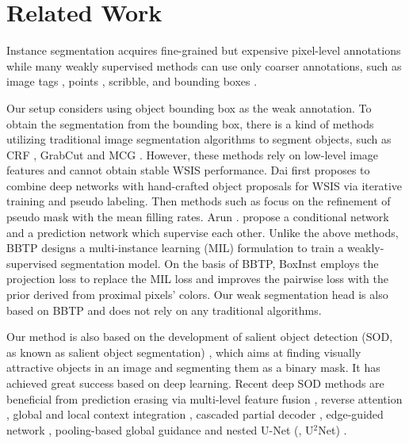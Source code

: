 \documentclass[final]{cvpr}
\begin{document}
\vspace{-3mm}
\section{Related Work}
\vspace{-1mm}

Instance segmentation acquires fine-grained but expensive pixel-level annotations while many weakly supervised methods can use only coarser annotations, such as image tags \cite{ahn2019weakly,cholakkal2019object,ge2019label,laradji2019masks,zhou2018weakly,zhu2019learning}, points \cite{laradji2019instance}, scribble\cite{lin2016scribblesup,tang2018normalized}, and bounding boxes \cite{arun2020weakly,hsu2019weakly,khoreva2017simple, tian2020boxinst, bbam}.

Our setup considers using object bounding box as the weak annotation. To obtain the segmentation from the bounding box, there is a kind of methods \cite{dai2015boxsup,papandreou2015weakly,khoreva2017simple} utilizing traditional image segmentation algorithms to segment objects, such as CRF \cite{krahenbuhl2011efficient}, GrabCut \cite{rother2004grabcut} and MCG \cite{pont2016multiscale}. However, these methods rely on low-level image features and cannot obtain stable WSIS performance. Dai \etal \cite{dai2015boxsup} first proposes to combine deep networks with hand-crafted object proposals for WSIS via iterative training and pseudo labeling. Then methods such as \cite{song2019box,kulharia12356box2seg} focus on the refinement of pseudo mask with the mean filling rates. Arun \etal. \cite{arun2020weakly} propose a conditional network and a prediction network which supervise each other. Unlike the above methods, BBTP \cite{hsu2019weakly} designs a multi-instance learning (MIL) formulation to train a weakly-supervised segmentation model. On the basis of BBTP, BoxInst \cite{tian2020boxinst} employs the projection loss to replace the MIL loss and improves the pairwise loss with the prior derived from proximal pixels’ colors. Our weak segmentation head is also based on BBTP and does not rely on any traditional algorithms.

Our method is also based on the development of salient object detection (SOD, as known as salient object segmentation) \cite{jiang2013salient,yang2013saliency,li2013saliency,borji2015salient,li2016deep,hou2017deeply,wang2017learning}, which aims at finding visually attractive objects in an image and segmenting them as a binary mask. It has achieved great success based on deep learning. Recent deep SOD methods are beneficial from prediction erasing via multi-level feature fusion \cite{zhang2017amulet}, reverse attention \cite{chen2018reverse}, global and local context integration \cite{Liu2018PiCANet}, cascaded partial decoder \cite{wu2019cascaded}, edge-guided network \cite{zhao2019egnet}, pooling-based global guidance \cite{liu2019simple} and nested U-Net (\ie, U$^2$Net) \cite{qin2020u2}.
\end{document}
